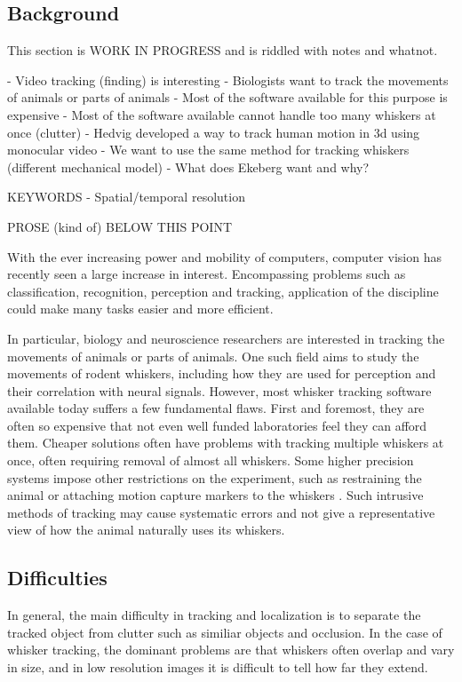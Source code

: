 \subsection{Background}
This section is WORK IN PROGRESS and is riddled with notes and whatnot.

- Video tracking (finding) is interesting
- Biologists want to track the movements of animals or parts of animals
- Most of the software available for this purpose is expensive
- Most of the software available cannot handle too many whiskers at once (clutter)
- Hedvig developed a way to track human motion in 3d using monocular video
- We want to use the same method for tracking whiskers (different mechanical model)
- What does Ekeberg want and why?

KEYWORDS
- Spatial/temporal resolution


PROSE (kind of) BELOW THIS POINT


With the ever increasing power and mobility of computers, computer vision has recently seen a large increase in interest. Encompassing problems such as classification, recognition, perception and tracking, application of the discipline could make many tasks easier and more efficient.

In particular, biology and neuroscience researchers are interested in tracking the movements of animals or parts of animals. One such field aims to study the movements of rodent whiskers, including how they are used for perception and their correlation with neural signals. However, most whisker tracking software available today suffers a few fundamental flaws. First and foremost, they are often so expensive that not even well funded laboratories feel they can afford them. Cheaper solutions often have problems with tracking multiple whiskers at once, often requiring removal of almost all whiskers. Some higher precision systems impose other restrictions on the experiment, such as restraining the animal or attaching motion capture markers to the whiskers \cite{BadExample1}. Such intrusive methods of tracking may cause systematic errors and not give a representative view of how the animal naturally uses its whiskers.

\subsection{Difficulties}
In general, the main difficulty in tracking and localization is to separate the tracked object from clutter such as similiar objects and occlusion. In the case of whisker tracking, the dominant problems are that whiskers often overlap and vary in size, and in low resolution images it is difficult to tell how far they extend.

